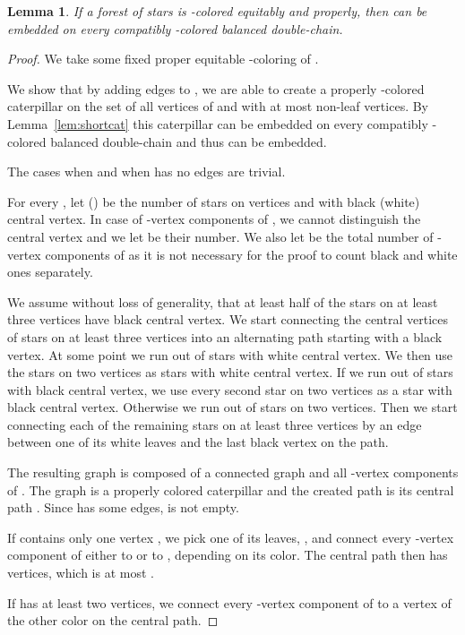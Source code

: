 \documentclass[12pt]{article}
\newtheorem{lemma}[theorem]{Lemma}
\begin{document}
\begin{lemma}
If a forest of stars  is -colored equitably and properly, then  can be embedded on every 
compatibly -colored balanced double-chain.
\end{lemma}
\begin{proof}
We take some fixed proper equitable -coloring of . 

We show that by adding edges to , we are able to create a properly -colored
caterpillar on the set of all vertices of  and with at most  non-leaf vertices.
By Lemma~\ref{lem:shortcat} this caterpillar can be embedded on every compatibly -colored balanced 
double-chain and thus  can be embedded.

The cases when  and when  has no edges are trivial.

For every , let  () be the number of stars on  vertices and with black (white) central vertex.
In case of -vertex components of , we cannot distinguish the 
central vertex and we let  be their number. We also let  be the total number of -vertex 
components of  as it is not necessary for the proof to count black and white ones separately.

We assume without loss of generality, that at least half of the stars on at least three vertices have black central vertex.
We start connecting the central vertices of stars on at least three vertices into an alternating path starting 
with a black vertex. At some point we run out of stars with white central vertex. We then use the stars on 
two vertices as stars with 
white central vertex. If we run out of stars with black central vertex, we use every second star on two vertices as 
a star with black central vertex. Otherwise we run out of stars on two vertices. Then we start connecting 
each of the remaining stars on at least three vertices by an edge between one of its white leaves and the last 
black vertex on the path.

The resulting graph is composed of a connected graph  and all -vertex components of . The graph  is 
a properly colored caterpillar and the created path is its central path . 
Since  has some edges,  is not empty.

If  contains only one vertex , we pick one of its leaves, , and connect every -vertex component of 
either to  or to , depending on its color. The central path then has  vertices, which is at most 
.

If  has at least two vertices, we connect every -vertex component of  to a vertex of 
the other color on the central path. 


\end{proof}
\end{document}
